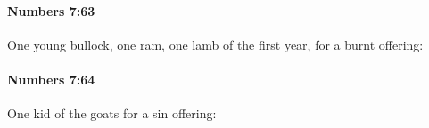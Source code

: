 		\paragraph{Numbers 7:63} %
			\label{NUMBERS-7-63}

			One young bullock, one ram, one lamb of the first year, for a burnt offering:


		\paragraph{Numbers 7:64} %
			\label{NUMBERS-7-64}

			One kid of the goats for a sin offering:


